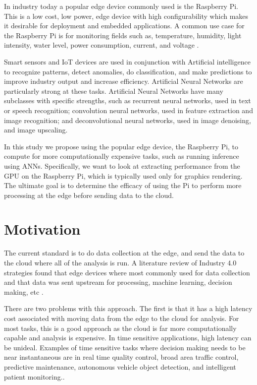 \documentclass[conference]{IEEEtran}
\begin{document}
 In industry today a popular edge device commonly used is the Raspberry Pi. This is a low cost, 
 low power, edge device with high configurability which makes it desirable for deployment and 
 embedded applications. A common use case for the Raspberry Pi is for monitoring 
 fields such as, temperature, humidity, light intensity, water level, power consumption, current, 
 and voltage \cite{endres_iot_2022,mudaliar_iot_2020,kadiyala_global_2017}. 

 Smart sensors and IoT devices are used in conjunction with Artificial intelligence to 
 recognize patterns, detect anomalies, do classification, and make predictions 
 to improve industry output  and increase efficiency. Artificial Neural Networks 
 are particularly strong at these tasks. Artificial Neural Networks have many 
 subclasses with specific strengths, such as recurrent neural networks, used in text 
 or speech recognition; convolution neural networks, used in feature extraction and 
 image recognition; and deconvolutional neural networks, used in image denoising, and 
 image upscaling\cite{abiodun_state---art_2018}.

 In this study we propose using the popular edge device, the Raspberry Pi, to compute for more 
 computationally expensive tasks, such as running inference using ANNs. Specifically, 
 we want to look at extracting performance from the GPU on the Raspberry Pi, which is 
 typically used only for graphics rendering. The ultimate goal is to determine the efficacy of 
 using the Pi to perform more processing at the edge before sending data to the cloud.

 \section{Motivation}

 The current standard is to do data collection at the edge, and send 
 the data to the cloud where all of the analysis is run. A literature 
 review of Industry 4.0 strategies found that edge devices where most 
 commonly used for data collection and that data was sent upstream 
 for processing, machine learning, decision making, etc \cite{henao-hernandez_control_2019}. 
 
 There are two problems with this approach. The first is that it has a 
 high latency cost associated with moving data from the edge to the cloud 
 for analysis. For most tasks, this is a good approach as the cloud is far 
 more computationally capable and analysis is expensive. In time sensitive 
 applications, high latency can be unideal. Examples of time sensitive tasks where 
 decision making needs to be near instantaneous are in real time quality control,
 broad area traffic control, predictive maintenance, autonomous vehicle object detection, 
 and intelligent patient monitoring\cite{edge_ai}..
\end{document}
